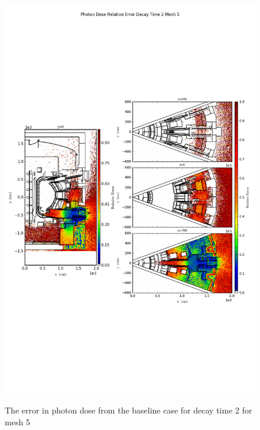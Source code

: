 \begin{figure}[ht!]
\centering
\includegraphics[trim={0cm 9cm 0cm 10cm},clip,scale=0.75]{../plots/final_model_nob4c/Photon_Dose_Relative_Error_Decay_Time_2_Mesh_5.png}
\label{fig:photons_dc2_no4bc_m5_error}
\caption{The error in photon dose from the baseline case for decay time 2 for mesh 5}
\end{figure}

